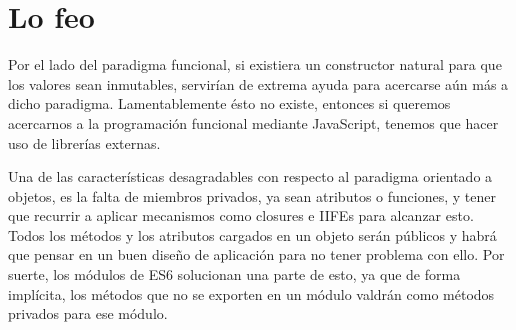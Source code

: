 \section{Lo feo}

Por el lado del paradigma funcional, si existiera un constructor natural para que los valores sean inmutables, servirían de extrema ayuda para acercarse aún más a dicho paradigma. Lamentablemente ésto no existe, entonces si queremos acercarnos a la programación funcional mediante JavaScript, tenemos que hacer uso de librerías externas.

Una de las características desagradables con respecto al paradigma orientado a objetos, es la falta de miembros privados, ya sean atributos o funciones, y tener que recurrir a aplicar mecanismos como closures e IIFEs para alcanzar esto. Todos los métodos y los atributos cargados en un objeto serán públicos y habrá que pensar en un buen diseño de aplicación para no tener problema con ello. Por suerte, los módulos de ES6 solucionan una parte de esto, ya que de forma implícita, los métodos que no se exporten en un módulo valdrán como métodos privados para ese módulo.